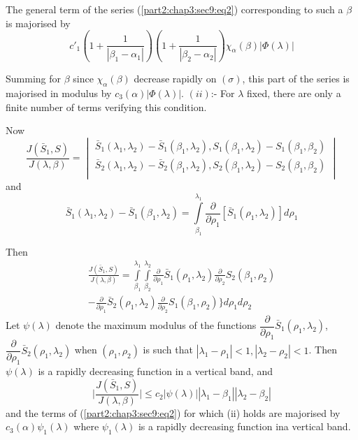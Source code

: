 The general term of the series (\ref{part2:chap3:sec9:eq2}) corresponding to such a $\beta$
is majorised by 
$$
c'_1(1+\frac{1}{|\beta_1 -\alpha_1|})(1+\frac{1}{|\beta_2
  -\alpha_2|})\chi_ \alpha (\beta)|\Phi (\lambda)| 
$$

Summing for $\beta$ since $\chi_ \alpha (\beta)$ decrease rapidly on
$(\sigma)$, this part of the series is majorised in modulus by
$c_3(\alpha)|\Phi(\lambda)|$. $(ii)$:- For $\lambda$ fixed, there are
only a finite number of terms verifying this condition. 

Now\pageoriginale
\begin{equation*}
  \frac{J (\bar{S}_1,S)}{J(\lambda, \beta)}=
  \begin{vmatrix}
    \bar{S}_1 (\lambda_1,\lambda_2)-\bar{S}_1
    (\beta_1,\lambda_2),S_1(\beta_1,\lambda_2)-S_1(\beta_1,
    \beta_2)\\ \bar{S}_2 (\lambda_1,\lambda_2)-\bar{S}_2
    (\beta_1,\lambda_2),S_2(\beta_1,\lambda_2)-S_2(\beta_1,
    \beta_2)\\ 
  \end{vmatrix}
\end{equation*}
and
$$
\bar{S}_1 (\lambda_1,\lambda_2)-\bar{S}_1 (\beta_1,\lambda_2)=\int 
\limits^{\lambda_1}_{\beta_1} \frac{\partial}{\partial \rho_1}
       [\bar{S}_1 (\rho_1,\lambda_2)]d \rho_1 
$$

Then
\begin{multline*}
  \frac{J (\bar{S}_1,S)}{J(\lambda, \beta)}=\int 
  \limits^{\lambda_1}_{\beta_1}\int 
  \limits^{\lambda_2}_{\beta_2}\frac{\partial}{\partial \rho_1}\bar{S}_1
  (\rho_1,\lambda_2)\frac{\partial}{\partial \rho_2}S_2(\beta_1,\rho_2) \\
  -\frac{\partial}{\partial \rho_1}\bar{S}_2
  (\rho_1,\lambda_2)\frac{\partial}{\partial \rho_2}S_1(\beta_1,\rho_2)
  \bigg \} d \rho_1d \rho_2 
\end{multline*}
Let $\psi (\lambda)$ denote the maximum modulus of the functions
$\dfrac{\partial}{\partial \rho_1}\bar{S}_1
(\rho_1,\lambda_2)$, $\dfrac{\partial}{\partial \rho_1}\bar{S}_2
(\rho_1,\lambda_2)$ when $(\rho_1,\rho_2)$ is such that
$|\lambda_1-\rho_1|<1,|\lambda_2-\rho_2|<1$. Then $\psi (\lambda)$ is
a rapidly decreasing function in a vertical band, and 
$$
\bigg|\frac{J (\bar{S}_1,S)}{J(\lambda, \beta)}\bigg| \leq c_2 |\psi
(\lambda)| |\lambda_1-\beta_1| |\lambda_2-\beta_2| 
$$
and the terms of (\ref{part2:chap3:sec9:eq2}) for which (ii) holds are
majorised by 
$c_3(\alpha)\psi_1(\lambda)$ where $\psi_1(\lambda)$ is a rapidly
decreasing function in\pageoriginale a vertical band. 

